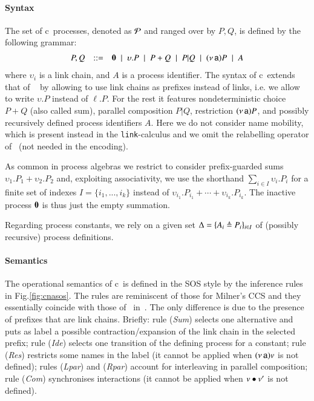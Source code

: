 \paragraph{Syntax}
The set of c\CNA\ processes, denoted as $\cal{P}$ and ranged over by $P,Q$, is defined by the following grammar:
\[
\begin{array}{rcl}
P,Q & ::= &
\mathbf{0} \;\mid\;
\upsilon.P  \;\mid\;
P+Q \;\mid\;
P|Q \;\mid\;
(\nu\, \mathsf{a}) P \;\mid\;
A
\end{array}
\]
\noindent
where $\upsilon_i$ is a  link chain,
and $A$ is a process identifier.
The syntax of c\CNA\  extends that of \CNA~\cite{BBB17} by allowing to use link chains as prefixes instead of links, i.e. we allow to write $\upsilon.P$ instead of $\ell.P$.
For the rest it features nondeterministic choice $P+Q$ (also called sum), parallel composition $P|Q$, restriction $(\nu\, \mathsf{a}) P$, and possibly recursively defined process identifiers $A$. 
Here we do not consider name mobility, which is present instead in the {\tt link}-calculus and we omit the relabelling operator of \CNA\ (not needed in the encoding).

As common in process algebras we restrict to consider prefix-guarded sums $\upsilon_1.P_1 + \upsilon_2.P_2$ and, exploiting associativity, we use the shorthand $\sum_{i\in I} \upsilon_i.P_i$ for a finite set of indexes $I=\{i_1,...,i_k\}$ instead of $\upsilon_{i_1}.P_{i_1} + \cdots + \upsilon_{i_k}.P_{i_k}$.
The inactive process $\mathbf{0}$ is thus just the empty summation.

Regarding process constants,  we rely on a given set $\Delta=\{A_i\triangleq P_i\}_{i\in I}$ of (possibly
recursive) process definitions.


\paragraph{Semantics}

The operational semantics of c\CNA\ is defined in the SOS style by the inference rules in Fig.\ref{fig:cnasos}. The rules are reminiscent of those for Milner's CCS and they essentially coincide with those of \CNA\ in~\cite{BBB17}. The only difference is due to the presence of prefixes that are link chains.
Briefly: rule (\textit{Sum}) selects one alternative and puts as label a possible contraction/expansion of the link chain in the selected prefix; rule (\textit{Ide}) selects one transition of the defining process for a constant; rule (\textit{Res}) restricts some names in the label (it cannot be applied when $(\nu\, \mathsf{a})v$ is not defined); rules (\textit{Lpar}) and (\textit{Rpar}) account for interleaving in parallel composition; rule (\textit{Com}) 
synchronises interactions (it cannot be applied when $v \bullet v'$ is not defined).

